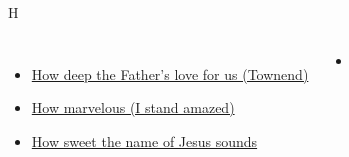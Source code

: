 \documentclass{beamer}
\begin{document}
\begin{frame}{H}
\begin{columns}
        \begin{itemize}
    \item \hyperlink{How deep the Father's love for us[](Townend)}{How deep the Father's love for us (Townend)} \phantom{}
    \item \hyperlink{I stand amazed['How marvelous']}{How marvelous (I stand amazed)} \phantom{ 1 1 1}
    \item \hyperlink{How sweet the name of Jesus sounds[]}{How sweet the name of Jesus sounds } \phantom{}
\end{itemize}
        \begin{itemize}
            \item[] \phantom{1}\end{itemize}


\end{columns}

\end{frame}
\end{document}
